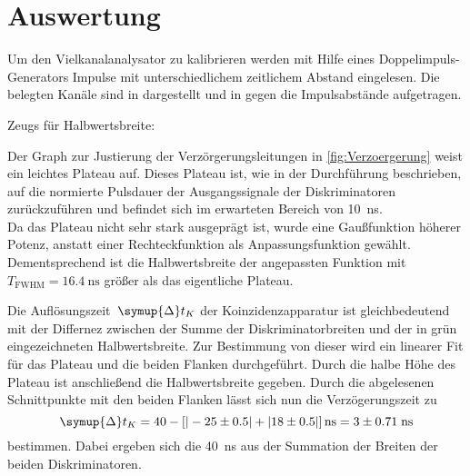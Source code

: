\section{Auswertung}
\label{sec:Auswertung}

Um den Vielkanalanalysator zu kalibrieren werden mit Hilfe eines Doppelimpuls-Generators Impulse
mit unterschiedlichem zeitlichem Abstand eingelesen. Die belegten Kanäle sind in dargestellt
und in gegen die Impulsabstände aufgetragen.



Zeugs für Halbwertsbreite: 

Der Graph zur Justierung der Verzörgerungsleitungen in \autoref{fig:Verzoergerung} weist ein leichtes Plateau auf.
Dieses Plateau ist, wie in der Durchführung beschrieben, auf die normierte Pulsdauer der Ausgangssignale der Diskriminatoren zurückzuführen und befindet sich im erwarteten Bereich von \SI{10}{\nano \second}. \\
Da das Plateau nicht sehr stark ausgeprägt ist, wurde eine Gaußfunktion höherer Potenz, anstatt einer Rechteckfunktion als Anpassungsfunktion gewählt.
Dementsprechend ist die Halbwertsbreite der angepassten Funktion mit $T_{\text{FWHM}} = \SI{16,4}{\nano \second}$ größer als das eigentliche Plateau.


Die Auflösungszeit~$\symup{\Delta}t_K$ der Koinzidenzapparatur ist gleichbedeutend
mit der Differnez zwischen der Summe der Diskriminatorbreiten und der in grün
eingezeichneten Halbwertsbreite. Zur Bestimmung von dieser wird
ein linearer Fit für das Plateau und die beiden Flanken durchgeführt. Durch die halbe
Höhe des Plateau ist anschließend die Halbwertsbreite gegeben. Durch die abgelesenen Schnittpunkte
mit den beiden Flanken lässt sich nun die Verzögerungszeit zu
\begin{equation}
  \symup{\Delta}t_K = 40 - \left[ |-25 \pm 0.5| + |18 \pm 0.5| \right] \si{\nano\second} = \- 3 \pm 0.71\; \si{\nano\second}
\end{equation}
bestimmen. Dabei ergeben sich die \SI{40}{\nano\second} aus der Summation der Breiten der beiden Diskriminatoren.
